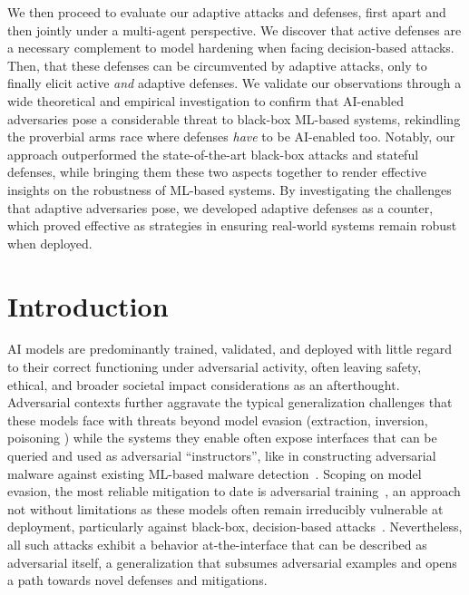 We then proceed to evaluate our adaptive attacks and defenses, first apart and then jointly under a multi-agent perspective.
We discover that active defenses are a necessary complement to model hardening when facing decision-based attacks.
Then, that these defenses can be circumvented by adaptive attacks, only to finally elicit active \emph{and} adaptive defenses.
We validate our observations through a wide theoretical and empirical investigation to confirm that AI-enabled adversaries pose a considerable threat to black-box ML-based systems, rekindling the proverbial arms race where defenses \emph{have} to be AI-enabled too.
Notably, our approach outperformed the state-of-the-art black-box attacks and stateful defenses, while bringing them these two aspects together to render effective insights on the robustness of ML-based systems.
By investigating the challenges that adaptive adversaries pose, we developed adaptive defenses as a counter, which proved effective as strategies in ensuring real-world systems remain robust when deployed.

\section{Introduction}

AI models are predominantly trained, validated, and deployed with little regard to their correct functioning under adversarial activity, often leaving safety, ethical, and broader societal impact considerations as an afterthought.
Adversarial contexts further aggravate the typical generalization challenges that these models face with threats beyond model evasion (extraction, inversion, poisoning \cite{he2020towards}) while the systems they enable often expose interfaces that can be queried and used as adversarial ``instructors'', like in constructing adversarial malware against existing ML-based malware detection~\cite{anderson2018learning, demetrio2021functionality}.
Scoping on model evasion, the most reliable mitigation to date is adversarial training~\cite{madry2017towards, wang2019convergence}, an approach not without limitations as these models often remain irreducibly vulnerable at deployment, particularly against black-box, decision-based attacks~\cite{brendel2018decision, chen2020hopskipjumpattack, yan2020policy}.
Nevertheless, all such attacks exhibit a behavior at-the-interface that can be described as adversarial itself, a generalization that subsumes adversarial examples and opens a path towards novel defenses and mitigations.

